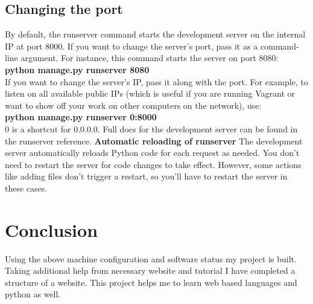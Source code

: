 \documentclass[11pt]{article}
\begin{document}
\begin{multicols}{2}
\subsection{Changing the port}
By default, the runserver command starts the development server on the internal IP at port 8000.
If you want to change the server’s port, pass it as a command-line argument. For instance, this command starts the server on port 8080:
\\	\textbf{python manage.py runserver 8080}
\\If you want to change the server’s IP, pass it along with the port. For example, to listen on all available public IPs (which is useful if you are running Vagrant or want to show off your work on other computers on the network), use:
\\	\textbf{python manage.py runserver 0:8000}
\\	0 is a shortcut for 0.0.0.0. Full docs for the development server can be found in the runserver reference.
\textbf{Automatic reloading of runserver}
The development server automatically reloads Python code for each request as needed. You don't need to restart the server for code changes to take effect. However, some actions like adding files don't trigger a restart, so you'll have to restart the server in these cases.
\section{Conclusion}
Using the above machine configuration and software status my project is built. Taking additional help from necessary website and tutorial I have completed a structure of a website. This project helps me to learn web based languages and python as well.
\end{multicols}
\end{document}
